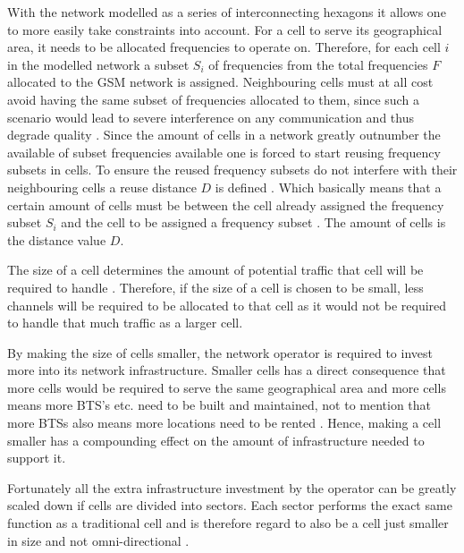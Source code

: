 With the network modelled as a series of interconnecting hexagons it allows one to more easily take constraints into account. For a cell to serve its geographical area, it needs to be allocated frequencies to operate on. Therefore, for each cell $i$ in the modelled network a subset $S_i$ of frequencies from the total frequencies $F$ allocated to the GSM network is assigned\cite{GSMArchitectureProtocolsServices}. Neighbouring cells must at all cost avoid having the same subset of frequencies allocated to them, since such a scenario would lead to severe interference on any communication and thus degrade quality \cite{GSMArchitectureProtocolsServices}.
Since the amount of cells in a network greatly outnumber the available of subset frequencies available one is forced to start reusing frequency subsets in cells. To ensure the reused frequency subsets do not interfere with their neighbouring cells a reuse distance $D$ is defined \cite{GSMArchitectureProtocolsServices}. Which basically means that a certain amount of cells must be between the cell already assigned the frequency subset $S_i$ and the cell to be assigned a frequency subset \cite{GSMArchitectureProtocolsServices}. The amount of cells is the distance value $D$.

The size of a cell determines the amount of potential traffic that cell will be required to handle \cite{GSM92,Eisenblatter,GSMArchitectureProtocolsServices}. Therefore, if the size of a cell is chosen to be small, less channels will be required to be allocated to that cell as it would not be required to handle that much traffic as a larger cell. 

By making the size of cells smaller, the network operator is required to invest more into its network infrastructure. Smaller cells has a direct consequence that more cells would be required to serve the same geographical area and more cells means more BTS's etc. need to be built and maintained, not to mention that more BTSs also means more locations need to be rented \cite{GSMArchitectureProtocolsServices}. Hence, making a cell smaller has a compounding effect on the amount of infrastructure needed to support it.

Fortunately all the extra infrastructure investment by the operator can be greatly scaled down if cells are divided into sectors\label{def:cellsector}. Each sector performs the exact same function as a traditional cell and is therefore regard to also be a cell just smaller in size and not omni-directional \cite{GSMArchitectureProtocolsServices,GSM92,GSMSysEngin}. 

